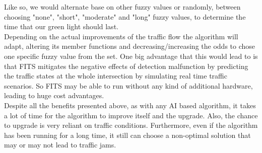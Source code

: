 \documentclass[17pt]{report}
\begin{document}
Like so, we would alternate base on other fuzzy values or randomly, between
choosing "none", "short", "moderate" and "long" fuzzy values, to determine 
the time that our green light should last.\\
\indent \indent
Depending on the actual improvements of the traffic flow the algorithm will 
adapt, altering its member functions and decreasing/increasing the odds to 
chose one specific fuzzy value from the set. One big advantage that this would 
lead to is that FITS mitigates the negative effects of detection malfunction
by predicting the traffic states at the whole intersection by simulating real
time traffic scenarios. So FITS may be able to run without any kind of additional
hardware, leading to huge cost advantages.\\
\indent \indent
Despite all the benefits presented above, as with any AI based algorithm,
it takes a lot of time for the algorithm to improve itself and the upgrade.
Also, the chance to upgrade is very reliant on traffic conditions. Furthermore, 
even if the algorithm has been running for a long time, it still can choose a
non-optimal solution that may or may not lead to traffic jams. 
\end{document}
